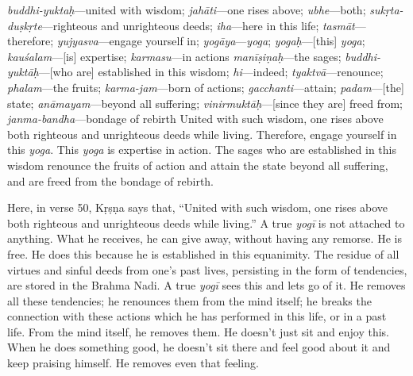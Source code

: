 {%
  \textit{buddhi-yuktaḥ}---united with wisdom; 
  \textit{jahāti}---one rises above; 
  \textit{ubhe}---both; 
  \textit{sukṛta-duṣkṛte}---righteous and unrighteous deeds; 
  \textit{iha}---here in this life; 
  \textit{tasmāt}---therefore; 
  \textit{yujyasva}---engage yourself in; 
  \textit{yogāya}---\textit{yoga}; 
  \textit{yogaḥ}---[this] \textit{yoga}; 
  \textit{kauśalam}---[is] expertise; 
  \textit{karmasu}---in actions
\textit{manīṣiṇaḥ}---the sages; 
  \textit{buddhi-yuktāḥ}---[who are] established in this wisdom; 
  \textit{hi}---indeed; 
  \textit{tyaktvā}---renounce; 
  \textit{phalam}---the fruits; 
  \textit{karma-jam}---born of actions; 
  \textit{gacchanti}---attain; 
  \textit{padam}---[the] state; 
  \textit{anāmayam}---beyond all suffering; 
  \textit{vinirmuktāḥ}---[since they are] freed from; 
  \textit{janma-bandha}---bondage of rebirth
}
{%
  United with such wisdom, one rises above both righteous and unrighteous deeds while living. Therefore, engage yourself in this \textit{yoga}. This \textit{yoga} is expertise in action. The sages who are established in this wisdom renounce the fruits of action and attain the state beyond all suffering, and are freed from the bondage of rebirth.
}

Here, in verse 50, Kṛṣṇa says that, “United with such wisdom, one rises above both righteous and unrighteous deeds while living.” A true \textit{yogī} is not attached to anything. What he receives, he can give away, without having any remorse. He is free. He does this because he is established in this equanimity. The residue of all virtues and sinful deeds from one’s past lives, persisting in the form of tendencies, are stored in the Brahma Nadi. A true \textit{yogī} sees this and lets go of it. He removes all these tendencies; he renounces them from the mind itself; he breaks the connection with these actions which he has performed in this life, or in a past life. From the mind itself, he removes them. He doesn’t just sit and enjoy this. When he does something good, he doesn’t sit there and feel good about it and keep praising himself. He removes even that feeling.

